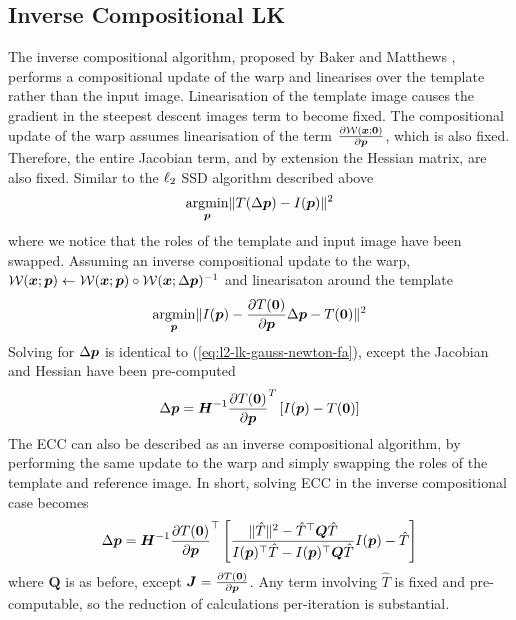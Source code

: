 \subsection{Inverse Compositional LK}\label{subsec:lk-ic}
The inverse compositional algorithm, proposed by Baker and Matthews \cite{RefWorks:74}, performs a compositional update of the warp and linearises over the template rather than the input image. Linearisation of the template image causes the gradient in the steepest descent images term to become fixed. The compositional update of the warp assumes linearisation of the term $\frac{\partial \mathcal{W}(\boldsymbol{x};\boldsymbol{0})}{\partial \boldsymbol{p}}$, which is also fixed. Therefore, the entire Jacobian term, and by extension the Hessian matrix, are also fixed. Similar to the $\ell_2$ SSD algorithm described above
\begin{equation}\label{eq:l2-lk-ic}
    \argmin_{\p} \norm{T(\Delta \p) - I(\p)}^2
\end{equation}
where we notice that the roles of the template and input image have been swapped. Assuming an inverse compositional update to the warp, $\mathcal{W}(\boldsymbol{x};\boldsymbol{p}) \leftarrow \mathcal{W}(\boldsymbol{x};\boldsymbol{p}) \circ \mathcal{W}(\boldsymbol{x};\Delta \boldsymbol{p})^{-1}$ and linearisaton around the template
\begin{equation}\label{eq:l2-lk-linearised-ic}
    \argmin_{\p} \norm{I(\p) - \frac{\partial T(\zero)}{\partial \p} \Delta \p - T(\zero)}^2
\end{equation}
Solving for $\Delta \boldsymbol{p}$ is identical to (\ref{eq:l2-lk-gauss-newton-fa}), except the Jacobian and Hessian have been pre-computed
\begin{equation}\label{eq:l2-lk-gauss-newton-ic}
    \Delta \p = \boldsymbol{H}^{-1} \frac{\partial T(\zero)}{\partial \p}^T \left[ I(\p) - T(\zero) \right]
\end{equation}
The ECC can also be described as an inverse compositional algorithm, by performing the same update to the warp and simply swapping the roles of the template and reference image. In short, solving ECC in the inverse compositional case becomes
\begin{equation}\label{eq:ecc-lk-gauss-newton-ic}
    \Delta \p = \boldsymbol{H}^{-1} \frac{\partial T(\zero)}{\partial \p}^{\top} \left[ \frac{\norm{\hat{T}}^2 - \hat{T}^{\top} \boldsymbol{Q} \hat{T}}{I(\p)^{\top} \hat{T} - I(\p)^{\top} \boldsymbol{Q} \hat{T}} I(\p) - \hat{T} \right]
\end{equation}
where $\boldsymbol{Q}$ is as before, except $\boldsymbol{J} = \frac{\partial T(\boldsymbol{0})}{\partial \boldsymbol{p}}$. Any term involving $\hat{T}$ is fixed and pre-computable, so the reduction of calculations per-iteration is substantial.

